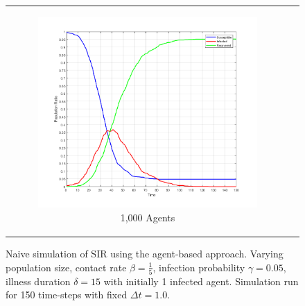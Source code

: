 \begin{figure}
\begin{center}
\begin{tabular}{c c}
		\begin{subfigure}[b]{0.20\textwidth}
			\centering
			\includegraphics[width=1.0\textwidth, angle=0]{./fig/step1_randmonad/SIR_1000agents_150t_1dt.png}
			\caption{1,000 Agents}
			\label{fig:sir_abs_approximating_1dt_1000agents}
		\end{subfigure}
	\end{tabular}
	
	\caption{Naive simulation of SIR using the agent-based approach. Varying population size, contact rate $\beta = \frac{1}{5}$, infection probability $\gamma = 0.05$, illness duration $\delta = 15$ with initially 1 infected agent. Simulation run for 150 time-steps with fixed $\Delta t = 1.0$.} 
	\label{fig:sir_abs_dynamics_naive}
\end{center}
\end{figure}

